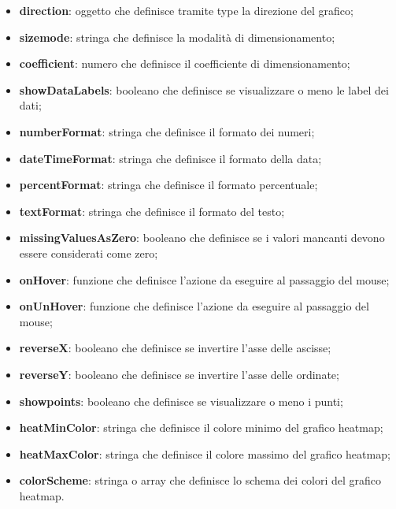 \begin{itemize}
      \item \textbf{direction}: oggetto che definisce tramite type la direzione del grafico;
      \item \textbf{sizemode}: stringa che definisce la modalità di dimensionamento;
      \item \textbf{coefficient}: numero che definisce il coefficiente di dimensionamento;
      \item \textbf{showDataLabels}: booleano che definisce se visualizzare o meno le label dei dati;
      \item \textbf{numberFormat}: stringa che definisce il formato dei numeri;
      \item \textbf{dateTimeFormat}: stringa che definisce il formato della data;
      \item \textbf{percentFormat}: stringa che definisce il formato percentuale;
      \item \textbf{textFormat}: stringa che definisce il formato del testo;
      \item \textbf{missingValuesAsZero}: booleano che definisce se i valori mancanti devono essere considerati come zero;
      \item \textbf{onHover}: funzione che definisce l'azione da eseguire al passaggio del mouse;
      \item \textbf{onUnHover}: funzione che definisce l'azione da eseguire al passaggio del mouse;
      \item \textbf{reverseX}: booleano che definisce se invertire l'asse delle ascisse;
      \item \textbf{reverseY}: booleano che definisce se invertire l'asse delle ordinate;
      \item \textbf{showpoints}: booleano che definisce se visualizzare o meno i punti;
      \item \textbf{heatMinColor}: stringa che definisce il colore minimo del grafico heatmap;
      \item \textbf{heatMaxColor}: stringa che definisce il colore massimo del grafico heatmap;
      \item \textbf{colorScheme}: stringa o array che definisce lo schema dei colori del grafico heatmap.
\end{itemize}

